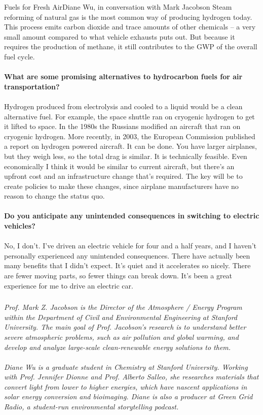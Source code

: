 \documentclass{papertex}
\begin{document}
\begin{news}{2}{Fuels for Fresh Air}{Diane Wu, in conversation with Mark Jacobson}{}{}
Steam reforming of natural gas is the most common way of producing hydrogen 
today. This process emits carbon dioxide and trace amounts of other 
chemicals – a very small amount compared to what vehicle exhausts puts out. 
But because it requires the production of methane, it still contributes to 
the GWP of the overall fuel cycle.
\\
\\
\textbf{What are some promising alternatives to hydrocarbon fuels for air 
    transportation?}
\\
\\
Hydrogen produced from electrolysis and cooled to a liquid would be a clean 
alternative fuel. For example, the space shuttle ran on cryogenic hydrogen to 
get it lifted to space. In the 1980s the Russians modified an aircraft that 
ran on cryogenic hydrogen. More recently, in 2003, the European Commission 
published a report on hydrogen powered aircraft. It can be done. You have 
larger airplanes, but they weigh less, so the total drag is similar. It is 
technically feasible. Even economically I think it would be similar to current 
aircraft, but there’s an upfront cost and an infrastructure change that’s 
required. The key will be to create policies to make these changes, since 
airplane manufacturers have no reason to change the status quo.
\\
\\
\textbf{Do you anticipate any unintended consequences in switching to electric 
    vehicles?}
\\
\\
No, I don’t. I’ve driven an electric vehicle for four and a half years, and I 
haven’t personally experienced any unintended consequences. There have 
actually been many benefits that I didn’t expect. It’s quiet and it 
accelerates so nicely. There are fewer moving parts, so fewer things can 
break down. It’s been a great experience for me to drive an electric car.

\subsubsection*{}

\emph{Prof. Mark Z. Jacobson is the Director of the Atmosphere / Energy Program 
within the Department of Civil and Environmental Engineering at Stanford 
University. The main goal of Prof. Jacobson’s research is to understand 
better severe atmospheric problems, such as air pollution and global warming, 
and develop and analyze large-scale clean-renewable energy solutions to them.}
\\
\\
\emph{Diane Wu is a graduate student in Chemistry at Stanford University. 
Working with Prof. Jennifer Dionne and Prof. Alberto Salleo, she researches 
materials that convert light from lower to higher energies, which have nascent 
applications in solar energy conversion and bioimaging. Diane is also a 
producer at Green Grid Radio, a student-run environmental storytelling 
podcast.}

\end{news}
\end{document}
